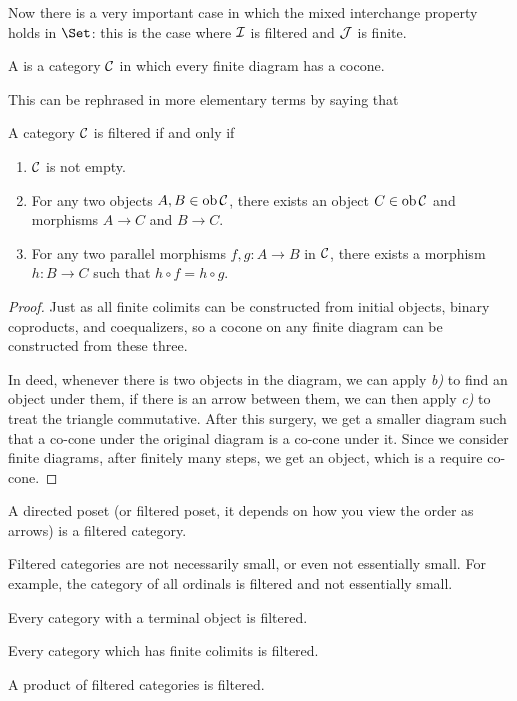   Now there is a very important case in which the mixed interchange property holds in $\Set$: this is the case where ${\cal I}$ is filtered and ${\cal J}$ is finite.
  \begin{defn}
    A  is a category ${\cal C}$ in which every finite diagram has a cocone.
  \end{defn}
  This can be rephrased in more elementary terms by saying that
  \begin{prop}\label{prop:filtered category}
    A category ${\cal C}$ is filtered if and only if
    \begin{enumerate}
      \item ${\cal C}$ is not empty.
      \item For any two objects $A,B\in\operatorname{ob}{\cal C}$, there exists an object $C\in\operatorname{ob}{\cal C}$ and morphisms $A\to C$ and $B\to C$.
      \item For any two parallel morphisms $f,g\colon A\to B$ in ${\cal C}$, there exists a morphism $h\colon B\to C$ such that $h\circ f=h\circ g$.
    \end{enumerate}
  \end{prop}
  \begin{proof}
    Just as all finite colimits can be constructed from initial objects, binary coproducts, and coequalizers, so a cocone on any finite diagram can be constructed from these three.

    In deed, whenever there is two objects in the diagram, we can apply \emph{b)} to find an object under them, if there is an arrow between them, we can then apply \emph{c)} to treat the triangle commutative. After this surgery, we get a smaller diagram such that a co-cone under the original diagram is a co-cone under it. Since we consider finite diagrams, after finitely many steps, we get an object, which is a require co-cone.
  \end{proof}

  \begin{exam}
    A directed poset (or filtered poset, it depends on how you view the order as arrows) is a filtered category.
  \end{exam}
  \begin{exam}
    Filtered categories are not necessarily small, or even not essentially small. For example, the category of all ordinals is filtered and not essentially small.
  \end{exam}
  \begin{exam}
    Every category with a terminal object is filtered.
  \end{exam}
  \begin{exam}
    Every category which has finite colimits is filtered.
  \end{exam}
  \begin{exam}
    A product of filtered categories is filtered.
  \end{exam}

